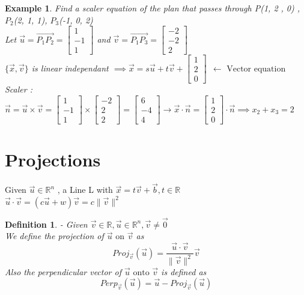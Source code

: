 \documentclass{article}
\newtheorem{ex}[theorem]{Example}
\newtheorem{definition}[theorem]{Definition}
\begin{document}
\begin{ex} Find a scaler equation of the plan that passes through P(1, 2 , 0) , \(P_2\)(2, 1, 1), \(P_3\)(-1, 0, 2) \\
Let \( \vec{u} = \vec{P_1P_2} = \begin{bmatrix} 1 \\ -1 \\ 1 \end{bmatrix} \) and \( \vec{v} = \vec{P_1P_3} = \begin{bmatrix} -2 \\ -2 \\ 2  \end{bmatrix} \)\\
 \( \{ \vec{x} , \vec{v}\} \) is linear independant \( \implies \vec{x} = s\vec{u} + t\vec{v} + \begin{bmatrix} 1 \\ 2 \\ 0 \end{bmatrix}  \ \ \leftarrow \text{ Vector equation}\) \\
 Scaler : \( \vec{n} = \vec{u} \times \vec{v} = \begin{bmatrix} 1 \\ -1 \\ 1 \end{bmatrix} \times \begin{bmatrix} -2 \\ 2 \\ 2 \end{bmatrix} = \begin{bmatrix} 6 \\ -4 \\ 4 \end{bmatrix} \rightarrow \vec{x} \cdot \vec{n} = \begin{bmatrix} 1 \\ 2 \\ 0 \end{bmatrix} \cdot \vec{n} \implies x_2 + x_3 = 2 \) 
\end{ex}

\section{Projections}
Given \( \vec{u} \in \mathbb{R}^n \) , a Line L with \( \vec{x} = t\vec{v}+ \vec{b} , t \in \mathbb{R} \) \\
\( \vec{u} \cdot \vec{v} = ( c\vec{u} + w) \vec{v} = c \| \vec{v} \| ^ 2 \) 
\begin{definition} 
- Given \(\vec{v} \in \mathbb{R} , \vec{u} \in \mathbb{R}^n, \vec{v} \neq \vec{0 } \) \\
We define the projection of \( \vec{u} \text{ on } \vec{v} \) as
 \[ Proj_{\vec{v}} ( \vec{u}) = \frac{\vec{u} \cdot \vec{v}}{\|\vec{v} \| ^2} \vec{v} \]
 Also the perpendicular vector of \( \vec{u} \text{ onto }  \vec{v} \) is defined as \\
 \[ Perp_{\vec{v}} (\vec{u}) = \vec{u} - Proj_{\vec{v}} ( \vec{u}) \]
\end {definition}
\end{document}
